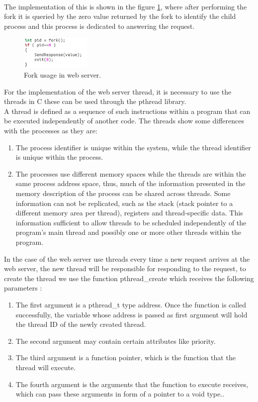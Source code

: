 \documentclass{article}
\begin{document}
\\The implementation of this is shown in the figure \ref{fig:intFork}, where after performing the fork it is queried by the zero value returned by the fork to identify the child process and this process is dedicated to answering the request.
\begin{figure}[H]
	\centering
	\captionsetup{justification=centering, margin=1cm}
    \includegraphics[width = 0.3\textwidth]{intFork.png}
    \caption{Fork usage in web server.}
	\label{fig:intFork}
\end{figure}
For the implementation of the web server thread, it is necessary to use the threads in C these can be used through the pthread library. 
\\A thread is defined as a sequence of such instructions within a program that can be executed independently of another code. The threads show some differences with the processes as they are:
\begin{enumerate}
    \item The process identifier is unique within the system, while the thread identifier is unique within the process.
    \item The processes use different memory spaces while the threads are within the same process address space, thus, much of the information presented in the memory description of the process can be shared across threads. Some information can not be replicated, such as the stack (stack pointer to a different memory area per thread), registers and thread-specific data. This information sufficient to allow threads to be scheduled independently of the program's main thread and possibly one or more other threads within the program.
\end{enumerate}
In the case of the web server use threads every time a new request arrives at the web server, the new thread will be responsible for responding to the request, to create the thread we use the function pthread\_create which receives the following parameters :
\begin{enumerate}
    \item The first argument is a pthread\_t type address. Once the function is called successfully, the variable whose address is passed as first argument will hold the thread ID of the newly created thread.
    \item The second argument may contain certain attributes like priority.
    \item The third argument is a function pointer, which is the function that the thread will execute.
    \item The fourth argument is the arguments that the function to execute receives, which can pass these arguments in form of a pointer to a void type.\cite{Thread}.
\end{enumerate}
\end{document}
